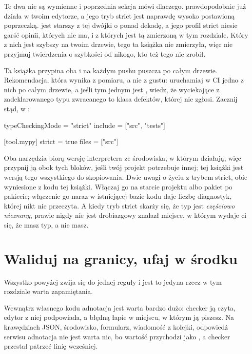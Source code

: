 Te dwa nie są wymienne i poprzednia sekcja mówi dlaczego. 
prawdopodobnie już działa w twoim edytorze, a jego tryb strict jest naprawdę
wysoko postawioną poprzeczką.  jest starszy z tej dwójki o ponad
dekadę, a jego profil strict niesie garść opinii, których  nie
ma, i z których  jest tą zmierzoną w tym rozdziale.
Który z nich jest szybszy na twoim drzewie, tego ta książka nie zmierzyła,
więc nie przyjmuj twierdzenia o szybkości od nikogo, kto też tego nie
zrobił.

Ta książka przypina oba i na każdym pushu puszcza  po całym
drzewie. Rekomendacja, która wynika z pomiaru, a nie z gustu: uruchamiaj w CI
jedno z nich po całym drzewie, a jeśli tym jednym jest , wiedz,
że  wyciekające z zadeklarowanego typu zwracanego to klasa defektów,
której nie zgłosi. Zacznij stąd, w :

\begin{tomlcode}
typeCheckingMode = "strict"
include = ["src", "tests"]

[tool.mypy]
strict = true
files = ["src"]
\end{tomlcode}

\noindent
Oba narzędzia biorą wersję interpretera ze środowiska, w którym działają,
więc przypnij ją obok tych bloków, jeśli twój projekt potrzebuje innej;
 tej książki jest wersją tego wszystkiego do
skopiowania. Dwie uwagi o życiu z trybem strict, obie wyniesione z kodu tej
książki. Włączaj go na starcie projektu albo pakiet po pakiecie; włączenie go
naraz w istniejącej bazie kodu daje liczbę diagnostyk, której nikt nie
przeczyta. A kiedy tryb strict skarży się, że typ jest \emph{częściowo
nieznany}, prawie nigdy nie jest drobiazgowy \dash{} znalazł miejsce, w
którym wydaje ci się, że masz typ, a nie masz.

\section{Waliduj na granicy, ufaj w środku}
\label{sec:ch03-boundary}

Wszystko powyżej zwija się do jednej reguły i jest to jedyna rzecz w tym
rozdziale warta zapamiętania.


\noindent
Wewnątrz własnego kodu adnotacja jest warta bardzo dużo: checker ją czyta,
edytor z niej podpowiada, a błędną łapie w miejscu, w którym ją piszesz. Na
krawędziach \dash{} JSON, środowisko, formularz, wiadomość z kolejki,
odpowiedź serwisu \dash{} adnotacja nie jest warta nic, bo wartość
przychodzi jako , a checker przestał patrzeć linię wcześniej.

